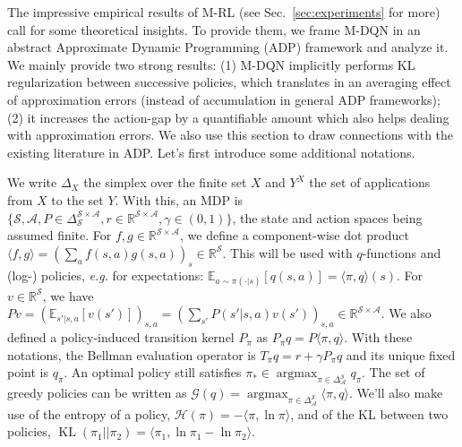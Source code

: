 \documentclass{article}
\newcommand{\gr}{\mathcal{G}}
\newcommand{\E}{\mathbb{E}}
\newcommand{\h}{\mathcal{H}}
\DeclareMathOperator*{\argmax}{argmax}
\DeclareMathOperator{\kl}{KL}
\newcommand{\states}{\mathcal{S}}
\newcommand{\actions}{\mathcal{A}}
\begin{document}
The impressive empirical results of M-RL (see Sec.~\ref{sec:experiments} for more) call for some theoretical insights. To provide them, we frame M-DQN in an abstract Approximate Dynamic Programming (ADP) framework and analyze it.
We mainly provide two strong results: (1) M-DQN implicitly performs KL regularization between successive policies, which translates in an averaging effect of approximation errors (instead of accumulation in general ADP frameworks); (2) it increases the action-gap by a quantifiable amount which also helps dealing with approximation errors.
We also use this section to draw connections with the existing literature in ADP. Let's first introduce some additional notations.

We write $\Delta_X$ the simplex over the finite set $X$ and $Y^X$ the set of applications from $X$ to the set $Y$. With this, an MDP is $\{\states, \actions, P\in\Delta_{\states}^{\states\times\actions}, r\in\mathbb{R}^{\states\times\actions}, \gamma\in(0,1)\}$, the state and action spaces being assumed finite. For $f,g\in\mathbb{R}^{\states\times\actions}$, we define a component-wise dot product $\langle f, g\rangle = (\sum_{a}f(s,a) g(s,a))_s\in\mathbb{R}^\states$. This will be used with $q$-functions and (log-) policies, \textit{e.g.} for expectations: $\E_{a\sim\pi(\cdot|s)}[q(s,a)] = \langle\pi,q\rangle(s)$.
For $v\in\mathbb{R}^\states$, we have $P v = (\E_{s'|s,a}[v(s')])_{s,a} = (\sum_{s'}P(s'|s,a)v(s'))_{s,a} \in\mathbb{R}^{\states\times\actions}$. We also defined a policy-induced transition kernel $P_\pi$ as $P_\pi q = P \langle \pi, q\rangle$. With these notations, the Bellman evaluation operator is $T_\pi q = r + \gamma P_\pi q$ and its unique fixed point is $q_\pi$. An optimal policy still satisfies $\pi_* \in \argmax_{\pi\in\Delta_\actions^\states} q_\pi$. The set of greedy policies can be written as $\gr(q) = \argmax_{\pi\in\Delta_\actions^\states} \langle \pi, q\rangle$. We'll also make use of the entropy of a policy, $\h(\pi) = -\langle \pi,\ln \pi\rangle$, and of the KL between two policies, $\kl(\pi_1||\pi_2) = \langle \pi_1, \ln\pi_1 - \ln\pi_2\rangle$.
\end{document}
